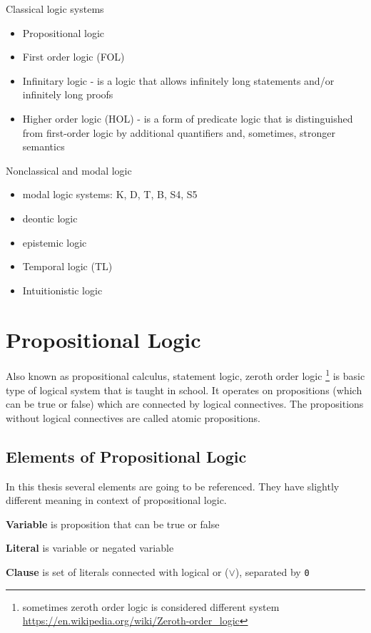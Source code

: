 Classical logic systems

\begin{itemize}
  \item Propositional logic 
  \item First order logic (FOL)
  \item Infinitary logic - is a logic that allows infinitely long statements and/or infinitely long proofs
  \item Higher order logic (HOL) - is a form of predicate logic that is distinguished from first-order logic by additional quantifiers and, sometimes, stronger semantics
\end{itemize}

Nonclassical and modal logic
\begin{itemize}
  \item modal logic systems: K, D, T, B, S4, S5
  \item deontic logic 
  \item epistemic logic
  \item Temporal logic (TL)
  \item Intuitionistic logic 
\end{itemize}

\section{Propositional Logic}
Also known as propositional calculus, statement logic, zeroth order logic \footnote{sometimes zeroth order logic is considered different system \url{https://en.wikipedia.org/wiki/Zeroth-order_logic}} is basic type of logical system that is taught in school. It operates on propositions (which can be true or false) which are connected by logical connectives. The propositions without logical connectives are called atomic propositions.

\subsection{Elements of Propositional Logic}

In this thesis several elements are going to be referenced. They have slightly different meaning in context of propositional logic.

\textbf{Variable} is proposition that can be true or false

\textbf{Literal} is variable or negated variable

\textbf{Clause} is set of literals connected with logical or ($\lor$), separated by \texttt{0}

